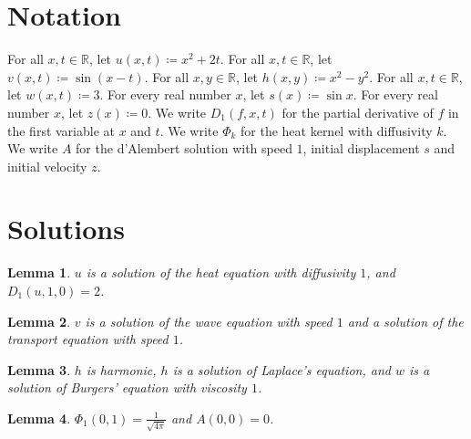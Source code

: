 \documentclass{article}
\newtheorem{lemma}{Lemma}
\begin{document}
\section{Notation}

For all $x,t\in\mathbb{R}$, let $u(x,t)\coloneqq x^2+2t$.
For all $x,t\in\mathbb{R}$, let $v(x,t)\coloneqq \sin(x-t)$.
For all $x,y\in\mathbb{R}$, let $h(x,y)\coloneqq x^2-y^2$.
For all $x,t\in\mathbb{R}$, let $w(x,t)\coloneqq 3$.
For every real number $x$, let $s(x)\coloneqq\sin x$.
For every real number $x$, let $z(x)\coloneqq0$.
We write $D_1(f,x,t)$ for the partial derivative of $f$ in the first variable at $x$ and $t$.
We write $\Phi_k$ for the heat kernel with diffusivity $k$.
We write $A$ for the d'Alembert solution with speed $1$, initial displacement $s$ and initial velocity $z$.

\section{Solutions}

\begin{lemma}\label{heat}
$u$ is a solution of the heat equation with diffusivity $1$, and $D_1(u,1,0)=2$.
\end{lemma}

\begin{lemma}\label{wave}
$v$ is a solution of the wave equation with speed $1$ and a solution of the transport equation with speed $1$.
\end{lemma}

\begin{lemma}\label{laplace}
$h$ is harmonic, $h$ is a solution of Laplace's equation, and $w$ is a solution of Burgers' equation with viscosity $1$.
\end{lemma}

\begin{lemma}\label{kernel}
$\Phi_1(0,1)=\frac{1}{\sqrt{4\pi}}$ and $A(0,0)=0$.
\end{lemma}
\end{document}
